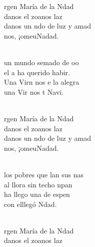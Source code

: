 \documentclass[12pt]{article}
\begin{document}
\begin{multicols*}{2}
\begin{cancion}%
	\begin{chorus}%
	rgen María de la Ndad\\
	danos el zoanos laz\\
	danos un ndo de luz y amad\\
	nos, ¡omeuNadad.\\
	\end{chorus}%
	\jump\\
	 un mundo semado de oo\\
	el a ha querido habir.\\
	Una Virn nos e la alegra\\
	una Vir nos t Navi.\\\jump\\
	\begin{chorus}%
	rgen María de la Ndad\\
	danos el zoanos laz\\
	danos un ndo de luz y amad\\
	nos, ¡omeuNadad.\\
	\end{chorus}%
	\jump\\
	los pobres que lan sus nas\\
	al  llora sin techo npan\\
	ha llego una  de espen\\
	con elllegó Ndad. \\\jump\\
	\begin{chorus}%
	rgen María de la Ndad\\
	danos el zoanos laz\\

\end{chorus}
\end{cancion}
\end{multicols*}
\end{document}
